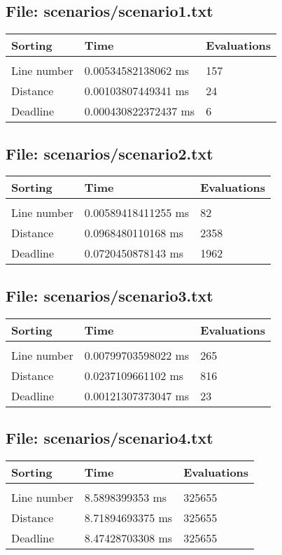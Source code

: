 \documentclass{scrartcl}
\begin{document}
\subsection{File: scenarios/scenario1.txt}\begin{tabular}{ l | l l} \\Sorting &Time & Evaluations\\\hline
\\ Line number &
0.00534582138062 ms
& 157
\\ Distance &
0.00103807449341 ms
& 24
\\ Deadline &
0.000430822372437 ms
& 6

\end{tabular} \subsection{File: scenarios/scenario2.txt}\begin{tabular}{ l | l l} \\Sorting &Time & Evaluations\\\hline
\\ Line number &
0.00589418411255 ms
& 82
\\ Distance &
0.0968480110168 ms
& 2358
\\ Deadline &
0.0720450878143 ms
& 1962

\end{tabular} \subsection{File: scenarios/scenario3.txt}\begin{tabular}{ l | l l} \\Sorting &Time & Evaluations\\\hline
\\ Line number &
0.00799703598022 ms
& 265
\\ Distance &
0.0237109661102 ms
& 816
\\ Deadline &
0.00121307373047 ms
& 23

\end{tabular} \subsection{File: scenarios/scenario4.txt}\begin{tabular}{ l | l l} \\Sorting &Time & Evaluations\\\hline
\\ Line number &
8.5898399353 ms
& 325655
\\ Distance &
8.71894693375 ms
& 325655
\\ Deadline &
8.47428703308 ms
& 325655


\end{tabular}
\end{document}
